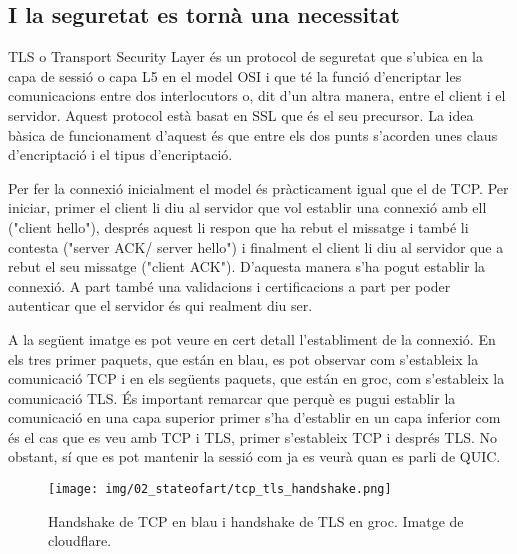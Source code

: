 \subsection{I la seguretat es tornà una necessitat}
{
    TLS o Transport Security Layer és un protocol de seguretat que s'ubica en la capa de sessió o capa L5 en el model OSI i que té la funció d'encriptar les
    comunicacions entre dos interlocutors o, dit d'un altra manera, entre el client i el servidor. Aquest protocol està basat en SSL que és el seu precursor.
    La idea bàsica de funcionament d'aquest és que entre els dos punts s'acorden unes claus d'encriptació i el tipus d'encriptació.
    
    Per fer la connexió inicialment el model és pràcticament igual que el de TCP. Per iniciar, primer el client li diu al servidor que vol establir una connexió 
    amb ell ("client hello"), després aquest li respon que ha rebut el missatge i també li contesta ("server ACK/ server hello") i finalment el client li diu al
    servidor que a rebut el seu missatge ("client ACK"). D'aquesta manera s'ha pogut establir la connexió. A part també una validacions i certificacions a part 
    per poder autenticar que el servidor és qui realment diu ser.

    A la següent imatge es pot veure en cert detall l'establiment de la connexió. En els tres primer paquets, que están en blau, es pot observar com s'estableix 
    la comunicació TCP i en els següents paquets, que están en groc, com s'estableix la comunicació TLS. És important remarcar que perquè es pugui establir la 
    comunicació en una capa superior primer s'ha d'establir en un capa inferior com és el cas que es veu amb TCP i TLS, primer s'estableix TCP i després TLS. No
    obstant, sí que es pot mantenir la sessió com ja es veurà quan es parli de QUIC.

    \begin{figure}[H]
        \label{fig:tcp_tls_handshake}
        \centering
        \texttt{[image: img/02\_stateofart/tcp\_tls\_handshake.png]}
        \caption[TCP i TLS handshake]{\footnotesize{Handshake de TCP en blau i handshake de TLS en groc. Imatge de cloudflare.}}
    \end{figure}

}

